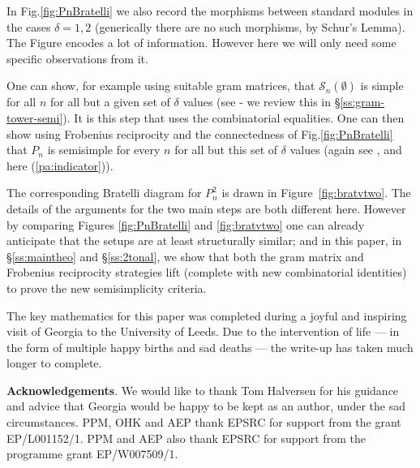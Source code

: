 \documentclass[reqno,10pt,a4paper]{amsart}
\newcommand{\cell}{\mathcal{S}}
\newcommand{\SSS}{\mathcal{S}} %
\begin{document}
In Fig.\ref{fig:PnBratelli}  %
we also record the morphisms between standard modules 
in the cases $\delta = 1,2$ 
(generically there are no such morphisms, by Schur's Lemma).
The Figure encodes a lot of information. 
However here we
will only need some specific observations from it.


One can show, 
for example
using 
suitable 
gram matrices, %
that 
$\SSS_n(\emptyset)$ is simple for all $n$ for all but a given set of 
$\delta$ values (see \cite{MartinSaleur94b} - we review this in 
\S\ref{ss:gram-tower-semi}). 
It is this step that 
uses  %
the combinatorial equalities. 
One can then show using Frobenius reciprocity and the connectedness of Fig.\ref{fig:PnBratelli} 
that $P_n$ is semisimple for every $n$ for all but this set of $\delta$ values 
(again see \cite{MartinSaleur94b}, and here (\ref{pa:indicator})). 

The corresponding Bratelli diagram for $P^2_n$ is drawn in Figure~\ref{fig:bratvtwo}. 
The details of the arguments for the two main steps are both different here. 
However  %
by comparing  %
Figures \ref{fig:PnBratelli} and \ref{fig:bratvtwo} 
one can already 
anticipate  %
that the setups are at least  
structurally  %
similar; 
and
in this paper,
in \S\ref{ss:maintheo} and \S\ref{ss:2tonal}, 
we show that both the gram matrix and Frobenius reciprocity strategies lift 
(complete with new combinatorial identities)
to prove the new 
semisimplicity criteria.   %



\medskip \vspace{.1in} 

The key mathematics for this paper was completed during a joyful  and inspiring visit of Georgia to the University of Leeds.
Due to the intervention of life --- in the form of multiple happy births and sad deaths --- the write-up 
has taken much longer to complete.

\medskip 

\noindent
{\bf Acknowledgements}.
We would like to thank Tom Halversen for his 
guidance and 
advice  %
that Georgia would be happy to be kept  as an author, under the sad circumstances.
PPM, OHK and AEP thank EPSRC for support from
the grant
EP/L001152/1.
PPM and AEP also thank EPSRC for support from the programme grant 
EP/W007509/1.
\end{document}
